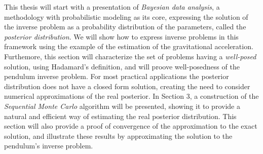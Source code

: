 This thesis will start with a presentation of \textit{Bayesian data analysis}, a methodology with probabilistic modeling as its core, expressing the solution of the inverse problem as a probability distribution of the parameters, called the \textit{posterior distribution}. We will show how to express inverse problems in this framework using the example of the estimation of the gravitational acceleration. Furthemore, this section will characterize the set of problems having a \textit{well-posed} solution, using Hadamard's \cite{hadamard} definition, and will proove well-posedness of the pendulum inverse problem. For most practical applications the posterior distribution does not have a closed form solution, creating the need to consider numerical approximations of the real posterior. In Section 3, a construction of the \textit{Sequential Monte Carlo} algorithm will be presented, showing it to provide a natural and efficient way of estimating the real posterior distribution. This section will also provide a proof of convergence of the approximation to the exact solution, and illustrate these results by approximating the solution to the pendulum's inverse problem.





